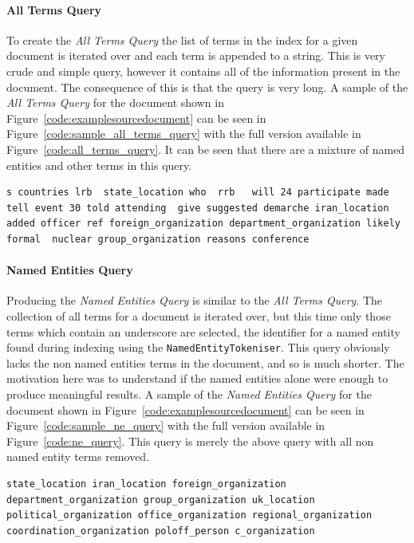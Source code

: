\documentclass{l4proj}
\newcommand{\code}[1]{\texttt{#1}}
\newenvironment{codelisting}{\captionsetup{type=listing}}{}
\begin{document}
\paragraph{All Terms Query}
To create the \textit{All Terms Query} the list of terms in the index for a given document is iterated over and each term is appended to a string. This is very crude and simple query, however it contains all of the information present in the document. The consequence of this is that the query is very long. A sample of the \textit{All Terms Query} for the document shown in Figure~\ref{code:examplesourcedocument} can be seen in Figure~\ref{code:sample_all_terms_query} with the full version available in Figure~\ref{code:all_terms_query}. It can be seen that there are a mixture of named entities and other terms in this query.
\begin{codelisting}
\begin{verbatim}
s countries lrb  state_location who  rrb   will 24 participate made tell event 30 told attending  give suggested demarche iran_location added officer ref foreign_organization department_organization likely formal  nuclear group_organization reasons conference
\end{verbatim}
\label{code:sample_all_terms_query}
\end{codelisting}
\paragraph{Named Entities Query}
Producing the \textit{Named Entities Query} is similar to the \textit{All Terms Query}. The collection of all terms for a document is iterated over, but this time only those terms which contain an underscore are selected, the identifier for a named entity found during indexing using the \code{NamedEntityTokeniser}. This query obviously lacks the non named entities terms in the document, and so is much shorter. The motivation here was to understand if the named entities alone were enough to produce meaningful results. A sample of the \textit{Named Entities Query} for the document shown in Figure~\ref{code:examplesourcedocument} can be seen in Figure~\ref{code:sample_ne_query} with the full version available in Figure~\ref{code:ne_query}. This query is merely the above query with all non named entity terms removed.
\begin{codelisting}
\begin{verbatim}
state_location iran_location foreign_organization department_organization group_organization uk_location political_organization office_organization regional_organization coordination_organization poloff_person c_organization
\end{verbatim}
\label{code:sample_ne_query}
\end{codelisting}
\end{document}
